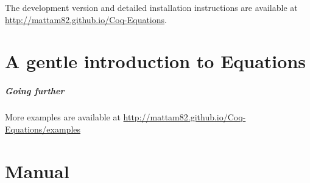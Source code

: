 \documentclass{report}
\begin{document}
The development version and detailed installation instructions are available at
\url{http://mattam82.github.io/Coq-Equations}.

\doparttoc
\parttoc
\tableofcontents

\chapter{A gentle introduction to Equations}
\label{cha:gentle-intro}


\paragraph{Going further}

More examples are available at \url{http://mattam82.github.io/Coq-Equations/examples}

\chapter{Manual}
\label{cha:manual}




\label{cha:bibliography}

\end{document}
